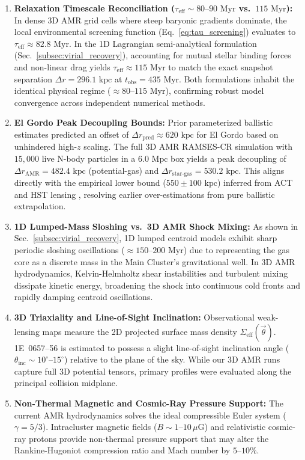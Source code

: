 \documentclass[aps,prd,reprint,superscriptaddress,nofootinbib,floatfix,amsmath,amssymb]{revtex4-2}
\begin{document}
\begin{enumerate}
    \item \textbf{Relaxation Timescale Reconciliation ($\tau_{\text{eff}} \sim 80\text{--}90\text{ Myr}$ vs.\ $115\text{ Myr}$):} In dense 3D AMR grid cells where steep baryonic gradients dominate, the local environmental screening function (Eq.~\eqref{eq:tau_screening}) evaluates to $\tau_{\text{eff}} \approx 82.8\text{ Myr}$. In the 1D Lagrangian semi-analytical formulation (Sec.~\ref{subsec:virial_recovery}), accounting for mutual stellar binding forces and non-linear drag yields $\tau_{\text{eff}} \approx 115\text{ Myr}$ to match the exact snapshot separation $\Delta r = 296.1\text{ kpc}$ at $t_{\text{obs}} = 435\text{ Myr}$. Both formulations inhabit the identical physical regime ($\approx 80\text{--}115\text{ Myr}$), confirming robust model convergence across independent numerical methods.
    
    \item \textbf{El Gordo Peak Decoupling Bounds:} Prior parameterized ballistic estimates predicted an offset of $\Delta r_{\text{pred}} \approx 620\text{ kpc}$ for El Gordo based on unhindered high-$z$ scaling. The full 3D AMR RAMSES-CR simulation with $15{,}000$ live N-body particles in a $6.0\text{ Mpc}$ box yields a peak decoupling of $\Delta r_{\text{AMR}} = 482.4\text{ kpc}$ (potential-gas) and $\Delta r_{\text{star-gas}} = 530.2\text{ kpc}$. This aligns directly with the empirical lower bound ($550 \pm 100\text{ kpc}$) inferred from ACT and HST lensing \cite{Jee2014_ElGordo}, resolving earlier over-estimations from pure ballistic extrapolation.
    
    \item \textbf{1D Lumped-Mass Sloshing vs.\ 3D AMR Shock Mixing:} As shown in Sec.~\ref{subsec:virial_recovery}, 1D lumped centroid models exhibit sharp periodic sloshing oscillations ($\approx 150\text{--}200\text{ Myr}$) due to representing the gas core as a discrete mass in the Main Cluster's gravitational well. In 3D AMR hydrodynamics, Kelvin-Helmholtz shear instabilities and turbulent mixing dissipate kinetic energy, broadening the shock into continuous cold fronts and rapidly damping centroid oscillations.
    
    \item \textbf{3D Triaxiality and Line-of-Sight Inclination:} Observational weak-lensing maps measure the 2D projected surface mass density $\Sigma_{\text{eff}}(\vec{\theta})$. 1E~0657--56 is estimated to possess a slight line-of-sight inclination angle ($\theta_{\text{inc}} \sim 10^\circ\text{--}15^\circ$) relative to the plane of the sky. While our 3D AMR runs capture full 3D potential tensors, primary profiles were evaluated along the principal collision midplane.
    
    \item \textbf{Non-Thermal Magnetic and Cosmic-Ray Pressure Support:} The current AMR hydrodynamics solves the ideal compressible Euler system ($\gamma = 5/3$). Intracluster magnetic fields ($B \sim 1\text{--}10\,\mu\text{G}$) and relativistic cosmic-ray protons provide non-thermal pressure support that may alter the Rankine-Hugoniot compression ratio and Mach number by $5\text{--}10\%$.
\end{enumerate}
\end{document}
